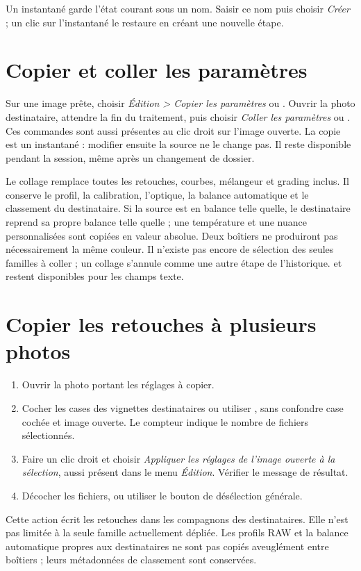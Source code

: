 Un instantané garde l’état courant sous un nom. Saisir ce nom puis choisir
\emph{Créer} ; un clic sur l’instantané le restaure en créant une nouvelle étape.


\section{Copier et coller les paramètres}
Sur une image prête, choisir \emph{Édition > Copier les paramètres} ou
. Ouvrir la photo destinataire, attendre la fin du
traitement, puis choisir \emph{Coller les paramètres} ou .
Ces commandes sont aussi présentes au clic droit sur l’image ouverte.
La copie est un instantané : modifier ensuite la source ne le change pas.
Il reste disponible pendant la session, même après un changement de dossier.

Le collage remplace toutes les retouches, courbes, mélangeur et grading inclus.
Il conserve le profil, la calibration, l’optique, la balance automatique et le
classement du destinataire. Si la source est en balance telle quelle,
le destinataire reprend sa propre balance telle quelle ; une température et
une nuance personnalisées sont copiées en valeur absolue. Deux boîtiers ne
produiront pas nécessairement la même couleur.
Il n’existe pas encore de sélection des seules familles à coller ; un collage
s’annule comme une autre étape de l’historique.
 et  restent disponibles pour les champs texte.

\section{Copier les retouches à plusieurs photos}
\begin{enumerate}
\item Ouvrir la photo portant les réglages à copier.
\item Cocher les cases des vignettes destinataires ou utiliser
, sans confondre case cochée
et image ouverte. Le compteur indique le nombre de fichiers sélectionnés.
\item Faire un clic droit et choisir \emph{Appliquer les réglages de l’image ouverte
à la sélection}, aussi présent dans le menu \emph{Édition}. Vérifier le message de résultat.
\item Décocher les fichiers, ou utiliser le bouton de désélection générale.
\end{enumerate}
Cette action écrit les retouches dans les compagnons des destinataires.
Elle n’est pas limitée à la seule famille actuellement dépliée. Les profils
RAW et la balance automatique propres aux destinataires ne sont pas copiés
aveuglément entre boîtiers ; leurs métadonnées de classement sont conservées.

